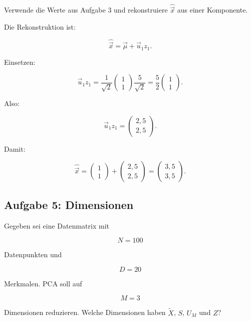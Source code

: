 Verwende die Werte aus Aufgabe 3 und rekonstruiere \(\hat{\vec{x}}\) aus einer Komponente.

\begin{examplebox}
Die Rekonstruktion ist:

\[
    \hat{\vec{x}}
    =
    \vec{\mu}
    +
    \vec{u}_1z_1.
\]

Einsetzen:

\[
    \vec{u}_1z_1
    =
    \frac{1}{\sqrt{2}}
    \begin{pmatrix}
        1 \\
        1
    \end{pmatrix}
    \frac{5}{\sqrt{2}}
    =
    \frac{5}{2}
    \begin{pmatrix}
        1 \\
        1
    \end{pmatrix}.
\]

Also:

\[
    \vec{u}_1z_1
    =
    \begin{pmatrix}
        2{,}5 \\
        2{,}5
    \end{pmatrix}.
\]

Damit:

\[
    \hat{\vec{x}}
    =
    \begin{pmatrix}
        1 \\
        1
    \end{pmatrix}
    +
    \begin{pmatrix}
        2{,}5 \\
        2{,}5
    \end{pmatrix}
    =
    \begin{pmatrix}
        3{,}5 \\
        3{,}5
    \end{pmatrix}.
\]
\end{examplebox}

\subsection{Aufgabe 5: Dimensionen}

Gegeben sei eine Datenmatrix mit

\[
    N=100
\]

Datenpunkten und

\[
    D=20
\]

Merkmalen.
PCA soll auf

\[
    M=3
\]

Dimensionen reduzieren.
Welche Dimensionen haben \(\tilde{X}\), \(S\), \(U_M\) und \(Z\)?

